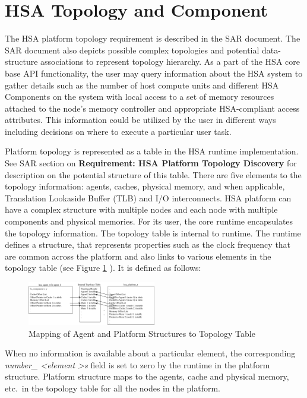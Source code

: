 \hypertarget{component}{}\section{HSA Topology and Component
}\label{topology}
The HSA platform topology requirement is described in the SAR
document. The SAR document also depicts possible complex topologies
and potential data-structure associations to represent topology
hierarchy.  As a part of the HSA core base API functionality, the
user may query information about the HSA system to gather details
such as the number of host compute units and different HSA
Components on the system with local access to a set of memory
resources attached to the node's memory controller and appropriate
HSA-compliant access attributes. This information could be utilized
by the user in different ways including decisions on where to
execute a particular user task. 

Platform topology is represented as a table in the HSA runtime
implementation. See SAR section on \textbf{Requirement: HSA Platform
Topology Discovery} for description on the potential structure of
this table. There are five elements to the topology information:
agents, caches, physical memory, and when applicable, Translation
Lookaside Buffer (TLB) and I/O interconnects. HSA platform can have
a complex structure with multiple nodes and each node with multiple
components and physical memories. For its user, the core runtime
encapsulates the topology information. The topology table is
internal to runtime. The runtime defines a structure,
 that represents properties such as the
clock frequency that are common across the platform and also links
to various elements in the topology table (see Figure
\ref{fig:tablemap} ).
It is defined as follows:



\begin{figure}
  \centering
  \includegraphics[width=0.5\textwidth] {maptoagent}
  \centering
  \caption{Mapping of Agent and Platform Structures to Topology
Table}
  \label{fig:tablemap}
\end{figure}

When no information is available about a particular element, the
corresponding {\itshape number\_ \textless element \textgreater s}
field is set to zero by the runtime in the platform structure.
Platform structure maps to the agents, cache and physical memory,
etc.\, in the topology table for all the nodes in the platform.

